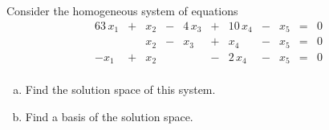 
\begin{exerciseStatement}


Consider the homogeneous system of equations 
\begin{alignat*}{6} 3 \, x_{1} &+& x_{2} &-& 4 \, x_{3} &+& 10 \, x_{4} &-& x_{5} &=& 0 \\ & & x_{2} &-& x_{3} &+& x_{4} &-& x_{5} &=& 0 \\-x_{1} &+& x_{2} & &  &-& 2 \, x_{4} &-& x_{5} &=& 0 \\ \end{alignat*}
            


\begin{enumerate}[(a)]
\item  Find the solution space of this system.
\item  Find a basis of the solution space.
\end{enumerate}
    
\end{exerciseStatement}
    
